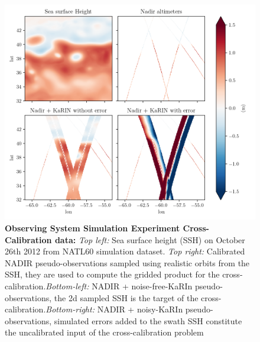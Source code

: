 \begin{bibunit}
\begin{figure}[!t]
    \begin{center}
        \includegraphics[width=\linewidth]{00_Calib/gridded_sensors.png}
    \end{center}
    \caption{\textbf{Observing System Simulation Experiment Cross-Calibration data:} \textit{Top left:} Sea surface height (SSH) on October 26th 2012 from NATL60 simulation dataset. \textit{Top right:} Calibrated NADIR pseudo-observations sampled using realistic orbits from the SSH, they are used to compute the gridded product for the cross-calibration.\textit{Bottom-left:} NADIR + noise-free-KaRIn pseudo-observations, the  2{\sc d} sampled SSH is the target of the cross-calibration.\textit{Bottom-right:} NADIR + noisy-KaRIn pseudo-observations, simulated errors added to the swath SSH constitute the uncalibrated input of the cross-calibration problem}
\label{fig:gridded}
\end{figure}


\end{bibunit}
